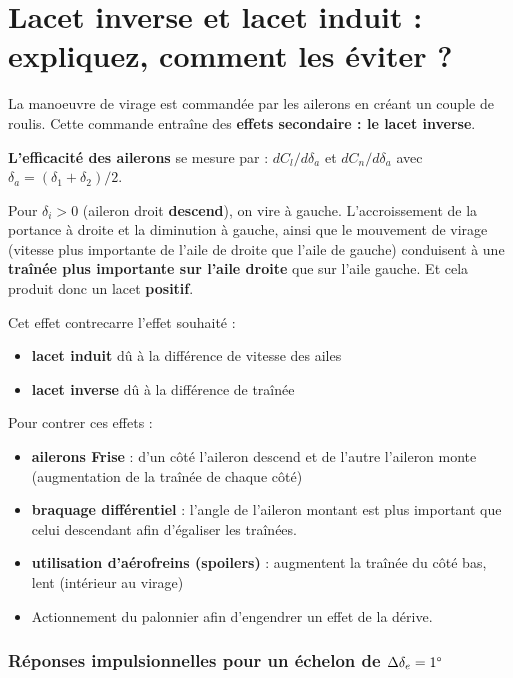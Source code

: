 \documentclass{report}
\begin{document}
\section{Lacet inverse et lacet induit : expliquez, comment les éviter ?}

La manoeuvre de virage est commandée par les ailerons en créant un couple de roulis. Cette commande entraîne des \textbf{effets secondaire : le lacet inverse}.

\textbf{L'efficacité des ailerons} se mesure par : $dC_l/d\delta_a$ et $dC_n/d\delta_a$ avec $\delta_a = (\delta_1+\delta_2)/2$.

Pour $\delta_i >0$ (aileron droit \textbf{descend}), on vire à gauche. L'accroissement de la portance à droite et la diminution à gauche, ainsi que le mouvement de virage (vitesse plus importante de l'aile de droite que l'aile de gauche) conduisent à une \textbf{traînée plus importante sur l'aile droite} que sur l'aile gauche. Et cela produit donc un lacet \textbf{positif}.

Cet effet contrecarre l'effet souhaité :
\begin{itemize}
    \item \textbf{lacet induit} dû à la différence de vitesse des ailes 
    \item \textbf{lacet inverse} dû à la différence de traînée 
\end{itemize}

Pour contrer ces effets :

\begin{itemize}
    \item \textbf{ailerons Frise} : d'un côté l'aileron descend et de l'autre l'aileron monte (augmentation de la traînée de chaque côté)
    \item \textbf{braquage différentiel} : l'angle de l'aileron montant est plus important que celui descendant afin d'égaliser les traînées.
    \item \textbf{utilisation d'aérofreins (spoilers)} : augmentent la traînée du côté bas, lent (intérieur au virage)
    \item Actionnement du palonnier afin d'engendrer un effet de la dérive.
\end{itemize}

\subsubsection{Réponses impulsionnelles pour un échelon de $\Delta\delta_e=1\degree$}
\end{document}
